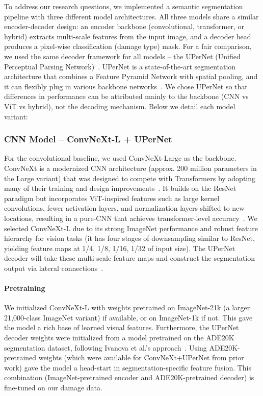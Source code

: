 \documentclass[conference]{IEEEtran}
\begin{document}
To address our research questions, we implemented a semantic segmentation pipeline with three different model architectures. All three models share a similar encoder-decoder design: an encoder backbone (convolutional, transformer, or hybrid) extracts multi-scale features from the input image, and a decoder head produces a pixel-wise classification (damage type) mask. For a fair comparison, we used the same decoder framework for all models – the UPerNet (Unified Perceptual Parsing Network)~\cite{xiao_unified_2018}. UPerNet is a state-of-the-art segmentation architecture that combines a Feature Pyramid Network with spatial pooling, and it can flexibly plug in various backbone networks~\cite{ivanova_artefact_2024}. We chose UPerNet so that differences in performance can be attributed mainly to the backbone (CNN vs ViT vs hybrid), not the decoding mechanism. Below we detail each model variant:

\subsubsection{CNN Model – ConvNeXt-L + UPerNet}
For the convolutional baseline, we used ConvNeXt-Large as the backbone. ConvNeXt is a modernized CNN architecture (approx. 200 million parameters in the Large variant) that was designed to compete with Transformers by adopting many of their training and design improvements~\cite{liu_convnet_2022,wang_upernet_2023}. It builds on the ResNet paradigm but incorporates ViT-inspired features such as large kernel convolutions, fewer activation layers, and normalization layers shifted to new locations, resulting in a pure-CNN that achieves transformer-level accuracy~\cite{liu_convnet_2022}. We selected ConvNeXt-L due to its strong ImageNet performance and robust feature hierarchy for vision tasks (it has four stages of downsampling similar to ResNet, yielding feature maps at 1/4, 1/8, 1/16, 1/32 of input size). The UPerNet decoder will take these multi-scale feature maps and construct the segmentation output via lateral connections~\cite{wang_upernet_2023}.
\paragraph*{Pretraining}
We initialized ConvNeXt-L with weights pretrained on ImageNet-21k (a larger 21,000-class ImageNet variant) if available, or on ImageNet-1k if not. This gave the model a rich base of learned visual features. Furthermore, the UPerNet decoder weights were initialized from a model pretrained on the ADE20K segmentation dataset, following Ivanova et al.’s approach~\cite{ivanova_artefact_2024}. Using ADE20K-pretrained weights (which were available for ConvNeXt+UPerNet from prior work) gave the model a head-start in segmentation-specific feature fusion. This combination (ImageNet-pretrained encoder and ADE20K-pretrained decoder) is fine-tuned on our damage data.
\end{document}
